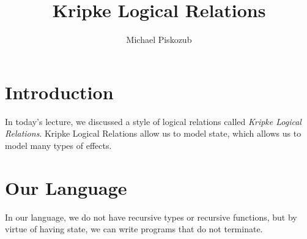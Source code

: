 \documentclass{notes}
\title{Kripke Logical Relations}
\author{Michael Piskozub}
\begin{document}
\maketitle

\newcommand{\proves}{\vdash}

\newcommand{\new}[2]{\textsf{new}\langle#1\rangle(#2)}
\newcommand*{\defeq}{\mathrel{\vcenter{\baselineskip0.5ex \lineskiplimit0pt
                     \hbox{\scriptsize.}\hbox{\scriptsize.}}}%
                     =}
\newcommand{\store}[2]{#1 \defeq #2}
\newcommand{\deref}[1]{! \, #1}

\newcommand{\bool}{\textsf{bool}}
\newcommand{\prodtyp}[2]{#1 \: \times \: #2}
\newcommand{\sumtyp}[2]{#1 \: + \: #2}
\newcommand{\arrow}[2]{#1 \: \rightarrow \: #2}
\newcommand{\unit}{\textsf{unit}}
\newcommand{\reftyp}[1]{\textsf{ref} \:\: #1}

\newcommand{\typing}[5]{#1; #2 \proves #3 : #4 \dashv #5}

\newcommand{\step}[4]{#1; #2 \longrightarrow #3; #4}

\newcommand{\Vold}[2]{V(#1)(#2)}
\newcommand{\Vnew}[3]{V(#1)(#2 \; @ \; #3)}
\newcommand{\Eold}[2]{E(#1)(#2)}
\newcommand{\Enew}[3]{E(#1)(#2 \; @ \; #3)}

\newcommand{\dom}[1]{\textsf{dom}(#1)}
\newcommand{\deq}{\overset{\Delta}{=}}
\newcommand{\defas}[2]{#1 \; \deq \; #2}
\newcommand{\deqv}{\overset{\Delta}{\iff}}
\newcommand{\defiff}[2]{#1 \; \deqv \; #2}

\section{Introduction}

In today's lecture, we discussed a style of logical relations called \emph{Kripke Logical Relations}.
Kripke Logical Relations allow us to model state, which allows us to model many types of effects.

\section{Our Language}

In our language, we do not have recursive types or recursive functions, but by virtue of having state, we can write programs that do not terminate.
\end{document}
